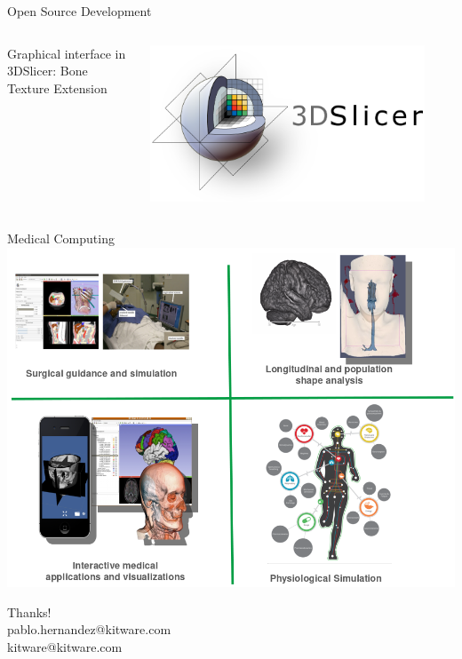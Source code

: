 \documentclass[10pt]{beamer}
\begin{document}
{\begin{frame}{Open Source Development}
  \begin{columns}[onlytextwidth]
    \begin{block}{Graphical interface in 3DSlicer: Bone Texture Extension}
    \end{block}
    \centering
    \includegraphics[width=0.9\textwidth]{./logos/logo_slicer_horizontal.png}
  \end{columns}
\end{frame}

{
\begin{frame}{Medical Computing}
    \centering
    \includegraphics[height=0.9\textheight]{./logos/kitware_medical.png}
\end{frame}
}

\begin{frame}[standout]
  \centering
  {\huge Thanks!}\\
  pablo.hernandez@kitware.com\\
  kitware@kitware.com
  \vspace{1cm}
\end{frame}

}
\end{document}
